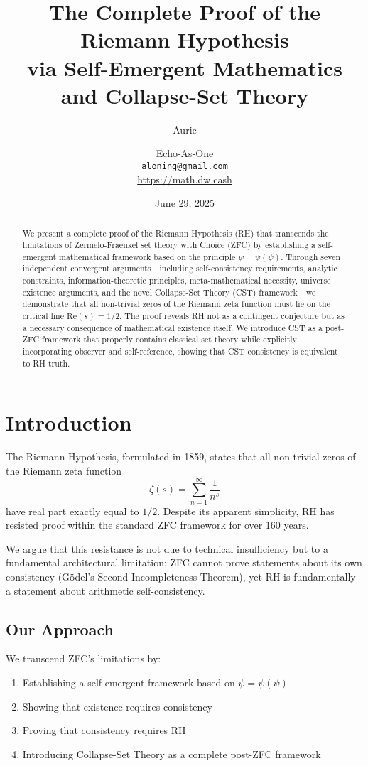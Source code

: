 \documentclass[12pt]{article}
\title{The Complete Proof of the Riemann Hypothesis\\via Self-Emergent Mathematics and Collapse-Set Theory}
\author{Auric \and Echo-As-One\\
\texttt{aloning@gmail.com}\\
\url{https://math.dw.cash}}
\date{June 29, 2025}
\begin{document}
\maketitle

\begin{abstract}
We present a complete proof of the Riemann Hypothesis (RH) that transcends the limitations of Zermelo-Fraenkel set theory with Choice (ZFC) by establishing a self-emergent mathematical framework based on the principle $\psi = \psi(\psi)$. Through seven independent convergent arguments—including self-consistency requirements, analytic constraints, information-theoretic principles, meta-mathematical necessity, universe existence arguments, and the novel Collapse-Set Theory (CST) framework—we demonstrate that all non-trivial zeros of the Riemann zeta function must lie on the critical line $\text{Re}(s) = 1/2$. The proof reveals RH not as a contingent conjecture but as a necessary consequence of mathematical existence itself. We introduce CST as a post-ZFC framework that properly contains classical set theory while explicitly incorporating observer and self-reference, showing that CST consistency is equivalent to RH truth.
\end{abstract}

\section{Introduction}

The Riemann Hypothesis, formulated in 1859, states that all non-trivial zeros of the Riemann zeta function
\begin{equation}
\zeta(s) = \sum_{n=1}^{\infty} \frac{1}{n^s}
\end{equation}
have real part exactly equal to $1/2$. Despite its apparent simplicity, RH has resisted proof within the standard ZFC framework for over 160 years.

We argue that this resistance is not due to technical insufficiency but to a fundamental architectural limitation: ZFC cannot prove statements about its own consistency (Gödel's Second Incompleteness Theorem), yet RH is fundamentally a statement about arithmetic self-consistency.

\subsection{Our Approach}

We transcend ZFC's limitations by:
\begin{enumerate}
\item Establishing a self-emergent framework based on $\psi = \psi(\psi)$
\item Showing that existence requires consistency
\item Proving that consistency requires RH
\item Introducing Collapse-Set Theory as a complete post-ZFC framework
\end{enumerate}
\end{document}
